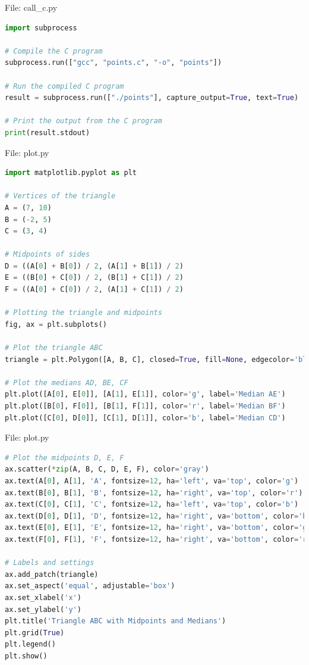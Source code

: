 \documentclass{beamer}
\numberwithin{equation}{section}
\theoremstyle{remark}
\begin{document}
\begin{frame}[fragile]{File: call\_c.py}
\begin{lstlisting}[language=Python]
import subprocess

# Compile the C program
subprocess.run(["gcc", "points.c", "-o", "points"])

# Run the compiled C program
result = subprocess.run(["./points"], capture_output=True, text=True)

# Print the output from the C program
print(result.stdout)
\end{lstlisting}
\end{frame}

\begin{frame}[fragile]{File: plot.py}
\begin{lstlisting}[language=Python]
import matplotlib.pyplot as plt

# Vertices of the triangle
A = (7, 10)
B = (-2, 5)
C = (3, 4)

# Midpoints of sides
D = ((A[0] + B[0]) / 2, (A[1] + B[1]) / 2)
E = ((B[0] + C[0]) / 2, (B[1] + C[1]) / 2)
F = ((A[0] + C[0]) / 2, (A[1] + C[1]) / 2)

# Plotting the triangle and midpoints
fig, ax = plt.subplots()

# Plot the triangle ABC
triangle = plt.Polygon([A, B, C], closed=True, fill=None, edgecolor='black', label='Triangle ABC')

# Plot the medians AD, BE, CF
plt.plot([A[0], E[0]], [A[1], E[1]], color='g', label='Median AE')
plt.plot([B[0], F[0]], [B[1], F[1]], color='r', label='Median BF')
plt.plot([C[0], D[0]], [C[1], D[1]], color='b', label='Median CD')
\end{lstlisting}
\end{frame}

\begin{frame}[fragile]{File: plot.py}
\begin{lstlisting}[language=Python]
# Plot the midpoints D, E, F
ax.scatter(*zip(A, B, C, D, E, F), color='gray')
ax.text(A[0], A[1], 'A', fontsize=12, ha='left', va='top', color='g')
ax.text(B[0], B[1], 'B', fontsize=12, ha='right', va='top', color='r')
ax.text(C[0], C[1], 'C', fontsize=12, ha='left', va='top', color='b')
ax.text(D[0], D[1], 'D', fontsize=12, ha='right', va='bottom', color='b')
ax.text(E[0], E[1], 'E', fontsize=12, ha='right', va='bottom', color='g')
ax.text(F[0], F[1], 'F', fontsize=12, ha='right', va='bottom', color='r')

# Labels and settings
ax.add_patch(triangle)
ax.set_aspect('equal', adjustable='box')
ax.set_xlabel('x')
ax.set_ylabel('y')
plt.title('Triangle ABC with Midpoints and Medians')
plt.grid(True)
plt.legend()
plt.show()
\end{lstlisting}
\end{frame}
\end{document}
